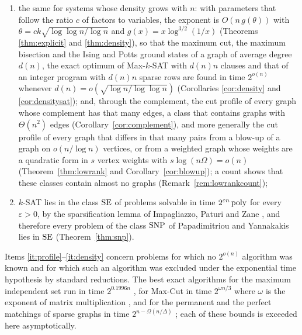 \begin{enumerate}[label=(\roman*),leftmargin=2.2em]
which contains exact cover with bounded element frequency and the partially
ordered knapsack problem (Theorem~\ref{thm:ip}, Corollary~\ref{cor:ip}), all
in time $2^{O(\rhon(n))}$;
\item\label{it:density} the same for systems whose density grows with $n$:
with parameters that follow the ratio $c$ of factors to variables, the exponent
is $O(n\,g(\theta))$ with $\theta=ck\sqrt{\log\log n/\log n}$ and
$g(x)=x\log^{3/2}(1/x)$ (Theorems \ref{thm:explicit} and \ref{thm:density}), so
that the maximum cut, the maximum bisection and the Ising and Potts ground states
of a graph of average degree $d(n)$, the exact optimum of Max-$k$-SAT with $d(n)n$
clauses and that of an integer program with $d(n)n$ sparse rows are found in time
$2^{o(n)}$ whenever $d(n)=o(\sqrt{\log n/\log\log n})$ (Corollaries
\ref{cor:density} and \ref{cor:densitysat}); and, through the complement, the cut
profile of every graph whose complement has that many edges, a class that contains
graphs with $\Theta(n^2)$ edges (Corollary~\ref{cor:complement}), and more generally the
cut profile of every graph that differs in that many pairs from a blow-up of a
graph on $o(n/\log n)$ vertices, or from a weighted graph whose weights are a
quadratic form in $s$ vertex weights with $s\log(n\Omega)=o(n)$
(Theorem~\ref{thm:lowrank} and Corollary~\ref{cor:blowup}); a count shows that
these classes contain almost no graphs (Remark~\ref{rem:lowrankcount});
\item\label{it:snp} $k$-SAT lies in the class $\operatorname{SE}$ of problems solvable in
time $2^{\varepsilon n}\operatorname{poly}$ for every $\varepsilon>0$, by the sparsification
lemma of Impagliazzo, Paturi and Zane \cite{IPZ01}, and therefore every problem of
the class $\operatorname{SNP}$ of Papadimitriou and Yannakakis \cite{PY91} lies in $\operatorname{SE}$
(Theorem~\ref{thm:snp}).
\end{enumerate}
Items \ref{it:profile}--\ref{it:density} concern problems for which no
$2^{o(n)}$ algorithm was known and for which such an algorithm was excluded under
the exponential time hypothesis by standard reductions. The best exact algorithms
for the maximum independent set run in time $2^{0.1996n}$ \cite{XN17}, for
Max-Cut in time $2^{\omega n/3}$ where $\omega$ is the exponent of matrix
multiplication \cite{Wil05}, and for the permanent and the perfect matchings of
sparse graphs in time $2^{n-\Omega(n/\Delta)}$ \cite{CP15}; each of these bounds
is exceeded here asymptotically.

